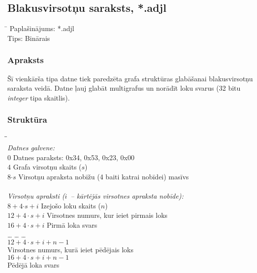 \subsection{Blakusvirsotņu saraksts, *.adjl}
\begin{tabbing}
\hspace{3cm}\=\kill
Paplašinājums:\> *.adjl \\
Tips:\> Binārais
\end{tabbing}

\subsubsection*{Apraksts}
Šī vienkārša tipa datne tiek paredzēta grafa struktūras glabāšanai blakusvirsotņu saraksta
veidā. Datne ļauj glabāt multigrafus un norādīt loku svarus (32 bitu \emph{integer} tipa
skaitlis).

\subsubsection*{Struktūra}
\begin{tabbing}
\hspace{3cm}\=\hspace{3cm}\=\kill
{}\> \>  \\
\emph{Datnes galvene:} \\
\(0\)\> Datnes paraksts: 0x34, 0x53, 0x23, 0x00 \\
\(4\)\> Grafa virsotņu skaits (\(s\))\\
\(8\)\(\cdot s\)\> Virsotņu apraksta nobīžu (4 baiti katrai nobīdei) masīvs \\

\\\emph{Virsotņu apraksti (\(i\)~-- kārtējās virsotnes apraksta nobīde):} \\
\(8+4\)\(\cdot s+i\)\> Izejošo loku skaits (\(n\))\\
\(12+4\cdot s+i\)\> Virsotnes numurs, kur ieiet pirmais loks \\
\(16+4\cdot s+i\)\> Pirmā loka svars \\
\ldots\> \ldots\> \ldots \\
\(12+4\cdot s+i+n-1\) \\
	\> Virsotnes numurs, kurā ieiet pēdējais loks \\
\(16+4\cdot s+i+n-1\) \\
	\> Pēdējā loka svars \\
\end{tabbing}



